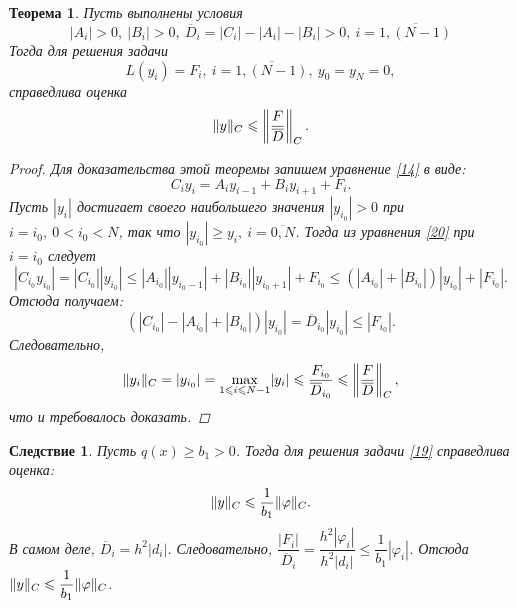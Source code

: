 \documentclass[11pt,a4paper,twoside,listtotoc,bibtotoc]{report}
\numberwithin{equation}{section}
\theoremstyle{definition}
\theoremstyle{plain}
\newtheorem{theorem}{Теорема}[section]
\newtheorem{cons}{Следствие}[section]
\DeclarePairedDelimiter\norm{\lVert}{\rVert}
\begin{document}
\begin{theorem}
%
    Пусть выполнены условия
    \begin{equation}
        \label{18}
        |A_i|>0,~|B_i|>0,~\overline{D}_i = |C_i| - |A_i| - |B_i| > 0,~i = \overline{1,(N-1)}
    \end{equation}
    Тогда для решения задачи
    \begin{equation}
        \label{19}
        L(y_i)=F_i,~i=\overline{1,(N-1)},~y_0=y_N=0,
    \end{equation}
    справедлива оценка
    $$
        \norm{y}_C \leqslant \left\lVert\dfrac{F}{\overline{D}}\right\rVert_C.
    $$
    \begin{proof}
        Для доказательства этой теоремы запишем уравнение \eqref{14} в виде:
        \begin{equation}
            \label{20}
            C_iy_i=A_iy_{i-1}+B_iy_{i+1}+F_i.
        \end{equation}
        Пусть $|y_i|$ достигает своего наибольшего значения $|y_{i_0}|>0$ при
        $i=i_0,~0<i_0<N$, так что $|y_{i_0}|\geqslant y_i, ~i=\overline{0,N}$.
        Тогда из уравнения \eqref{20} при $i=i_0$ следует
        $$
            |C_{i_0}y_{i_0}|=|C_{i_0}||y_{i_0}| \leqslant
            |A_{i_0}||y_{i_0-1}| + |B_{i_0}||y_{i_0+1}| + F_{i_0} \leqslant
            \left(|A_{i_0}|+|B_{i_0}|\right)|y_{i_0}|+|F_{i_0}|.
        $$
        Отсюда получаем:
        $$
            (|C_{i_0}|-|A_{i_0}|+|B_{i_0}|)|y_{i_0}| =
            \overline{D}_{i_0}|y_{i_0}| \leqslant |F_{i_0}|.
        $$
        Следовательно,
        $$
            \norm{y_i}_C=|y_{i_0}|=\underset{1 \leqslant i \leqslant N-1}\max|y_i| \leqslant
            \dfrac{F_{i_0}}{\overline{D}_{i_0}} \leqslant
            \left\lVert\dfrac{F}{\overline{D}}\right\rVert_C,
        $$
        что и требовалось доказать.
    \end{proof}
%
\end{theorem}
%
\begin{cons}
%
    Пусть $q(x) \geqslant b_1>0$. Тогда для решения задачи \eqref{19}
    справедлива оценка:
    $$
        \norm{y}_C\leqslant\dfrac{1}{b_1}\norm{\varphi}_C.
    $$
    В самом деле, $\overline{D}_i=h^2|d_i|$. Следовательно,
    $\dfrac{|F_i|}{\overline{D}_i} = \dfrac{h^2|\varphi_i|}{h^2|d_i|}
    \leqslant\dfrac{1}{b_1}|\varphi_i|$. Отсюда
    $\norm{y}_C\leqslant\dfrac{1}{b_1}\norm{\varphi}_C$.
%
\end{cons}
%
%
%
%
\end{document}
